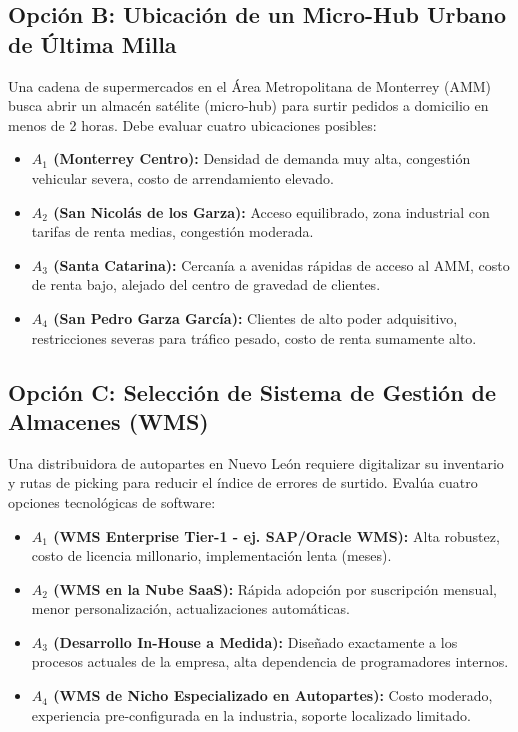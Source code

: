\documentclass[11pt,a4paper]{article}
\begin{document}
\subsection*{Opción B: Ubicación de un Micro-Hub Urbano de Última Milla}
Una cadena de supermercados en el Área Metropolitana de Monterrey (AMM) busca abrir un almacén satélite (micro-hub) para surtir pedidos a domicilio en menos de 2 horas. Debe evaluar cuatro ubicaciones posibles:
\begin{itemize}
  \item \textbf{$A_1$ (Monterrey Centro):} Densidad de demanda muy alta, congestión vehicular severa, costo de arrendamiento elevado.
  \item \textbf{$A_2$ (San Nicolás de los Garza):} Acceso equilibrado, zona industrial con tarifas de renta medias, congestión moderada.
  \item \textbf{$A_3$ (Santa Catarina):} Cercanía a avenidas rápidas de acceso al AMM, costo de renta bajo, alejado del centro de gravedad de clientes.
  \item \textbf{$A_4$ (San Pedro Garza García):} Clientes de alto poder adquisitivo, restricciones severas para tráfico pesado, costo de renta sumamente alto.
\end{itemize}

\subsection*{Opción C: Selección de Sistema de Gestión de Almacenes (WMS)}
Una distribuidora de autopartes en Nuevo León requiere digitalizar su inventario y rutas de picking para reducir el índice de errores de surtido. Evalúa cuatro opciones tecnológicas de software:
\begin{itemize}
  \item \textbf{$A_1$ (WMS Enterprise Tier-1 - ej. SAP/Oracle WMS):} Alta robustez, costo de licencia millonario, implementación lenta (meses).
  \item \textbf{$A_2$ (WMS en la Nube SaaS):} Rápida adopción por suscripción mensual, menor personalización, actualizaciones automáticas.
  \item \textbf{$A_3$ (Desarrollo In-House a Medida):} Diseñado exactamente a los procesos actuales de la empresa, alta dependencia de programadores internos.
  \item \textbf{$A_4$ (WMS de Nicho Especializado en Autopartes):} Costo moderado, experiencia pre-configurada en la industria, soporte localizado limitado.
\end{itemize}
\end{document}
